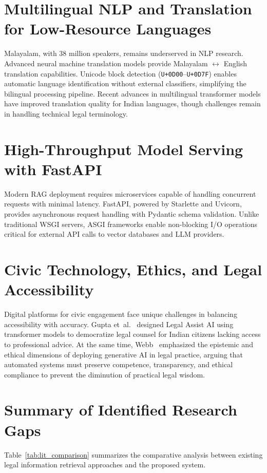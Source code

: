 \documentclass[12pt,a4paper]{report}
\begin{document}
\section{Multilingual NLP and Translation for Low-Resource Languages}
Malayalam, with 38 million speakers, remains underserved in NLP research. Advanced neural machine translation models provide Malayalam $\leftrightarrow$ English translation capabilities. Unicode block detection (\texttt{U+0D00}--\texttt{U+0D7F}) enables automatic language identification without external classifiers, simplifying the bilingual processing pipeline. Recent advances in multilingual transformer models have improved translation quality for Indian languages, though challenges remain in handling technical legal terminology.

\section{High-Throughput Model Serving with FastAPI}
Modern RAG deployment requires microservices capable of handling concurrent requests with minimal latency. FastAPI, powered by Starlette and Uvicorn, provides asynchronous request handling with Pydantic schema validation. Unlike traditional WSGI servers, ASGI frameworks enable non-blocking I/O operations critical for external API calls to vector databases and LLM providers.

\section{Civic Technology, Ethics, and Legal Accessibility}
Digital platforms for civic engagement face unique challenges in balancing accessibility with accuracy. Gupta et~al.~\cite{ref_gupta2024_legalassist} designed Legal Assist AI using transformer models to democratize legal counsel for Indian citizens lacking access to professional advice. At the same time, Webb~\cite{ref_webb2026_genai} emphasized the epistemic and ethical dimensions of deploying generative AI in legal practice, arguing that automated systems must preserve competence, transparency, and ethical compliance to prevent the diminution of practical legal wisdom.

\section{Summary of Identified Research Gaps}
Table~\ref{tab:lit_comparison} summarizes the comparative analysis between existing legal information retrieval approaches and the proposed system.
\end{document}
